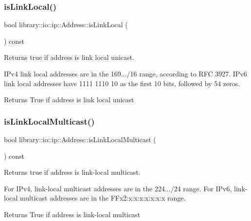 \subsubsection{\texorpdfstring{is\+Link\+Local()}{isLinkLocal()}}
{\footnotesize\ttfamily bool library\+::io\+::ip\+::\+Address\+::is\+Link\+Local (\begin{DoxyParamCaption}{ }\end{DoxyParamCaption}) const}



Returns true if address is link local unicast. 

I\+Pv4 link local addresses are in the 169.../16 range, according to R\+FC 3927. I\+Pv6 link local addresses have 1111 1110 10 as the first 10 bits, followed by 54 zeros.

\begin{DoxyReturn}{Returns}
True if address is link local unicast 
\end{DoxyReturn}
\mbox{\label{classlibrary_1_1io_1_1ip_1_1_address_a921a8995f53b38385f17d7bc2dd0809a}} 
\subsubsection{\texorpdfstring{is\+Link\+Local\+Multicast()}{isLinkLocalMulticast()}}
{\footnotesize\ttfamily bool library\+::io\+::ip\+::\+Address\+::is\+Link\+Local\+Multicast (\begin{DoxyParamCaption}{ }\end{DoxyParamCaption}) const}



Returns true if address is link-\/local multicast. 

For I\+Pv4, link-\/local multicast addresses are in the 224.../24 range. For I\+Pv6, link-\/local multicast addresses are in the F\+Fx2\+:x\+:x\+:x\+:x\+:x\+:x\+:x range.

\begin{DoxyReturn}{Returns}
True if address is link-\/local multicast 
\end{DoxyReturn}
\mbox{\label{classlibrary_1_1io_1_1ip_1_1_address_abd441207de67b876bafecca7ac1e70b1}} 

